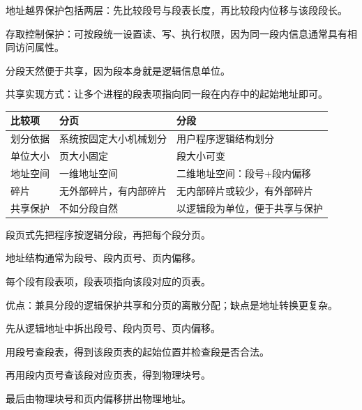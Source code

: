 \begin{points}
  \item 地址越界保护包括两层：先比较段号与段表长度，再比较段内位移与该段段长。
  \item 存取控制保护：可按段统一设置读、写、执行权限，因为同一段内信息通常具有相同访问属性。
  \item 分段天然便于共享，因为段本身就是逻辑信息单位。
  \item 共享实现方式：让多个进程的段表项指向同一段在内存中的起始地址即可。
\end{points}


\begin{longtable}{p{}p{}p{}}
\toprule
比较项 & 分页 & 分段 \\
\midrule
划分依据 & 系统按固定大小机械划分 & 用户程序逻辑结构划分 \\
单位大小 & 页大小固定 & 段大小可变 \\
地址空间 & 一维地址空间 & 二维地址空间：段号+段内偏移 \\
碎片 & 无外部碎片，有内部碎片 & 无内部碎片或较少，有外部碎片 \\
共享保护 & 不如分段自然 & 以逻辑段为单位，便于共享与保护 \\
\bottomrule
\end{longtable}

\begin{points}
  \item 段页式先把程序按逻辑分段，再把每个段分页。
  \item 地址结构通常为段号、段内页号、页内偏移。
  \item 每个段有段表项，段表项指向该段对应的页表。
  \item 优点：兼具分段的逻辑保护共享和分页的离散分配；缺点是地址转换更复杂。
\end{points}

\begin{points}
  \item 先从逻辑地址中拆出段号、段内页号、页内偏移。
  \item 用段号查段表，得到该段页表的起始位置并检查段是否合法。
  \item 再用段内页号查该段对应页表，得到物理块号。
  \item 最后由物理块号和页内偏移拼出物理地址。
\end{points}
